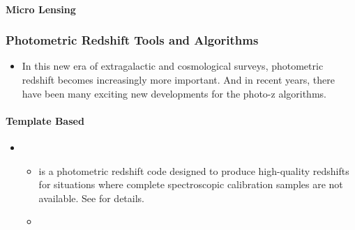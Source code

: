 \documentclass[letterpaper,10pt,english]{sphinxmanual}
\begin{document}
\paragraph{Micro Lensing}
\label{\detokenize{resource/astro/topics/lensing:micro-lensing}}

\subsubsection{Photometric Redshift Tools and Algorithms}
\label{\detokenize{resource/astro/topics/photoz:photometric-redshift-tools-and-algorithms}}\label{\detokenize{resource/astro/topics/photoz::doc}}\begin{itemize}
\item {} 
In this new era of extragalactic and cosmological surveys,
photometric redshift becomes increasingly more important. And in
recent years, there have been many exciting new developments for the
photo-z algorithms.

\end{itemize}


\paragraph{Template Based}
\label{\detokenize{resource/astro/topics/photoz:template-based}}\begin{itemize}
\item {} 
\begin{itemize}
\item {} 
 is a photometric redshift code designed to produce
high-quality redshifts for situations where complete spectroscopic
calibration samples are not available. See 
for details.

\item {} 

\end{itemize}

\end{itemize}
\end{document}
